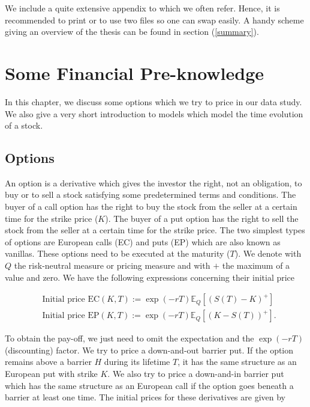 \documentclass[12pt,a4paper,oneside]{book}
\begin{document}
We include a quite extensive appendix to which we often refer. Hence, it is recommended to print or to use two files so one can swap easily. A handy scheme giving an overview of the thesis can be found in section (\ref{summary}).

\chapter{Some Financial Pre-knowledge}

In this chapter, we discuss some options which we try to price in our data study. We also give a very short introduction to models which model the time evolution of a stock. 

\section{Options}\label{Options}

An option is a derivative which gives the investor the right, not an obligation, to buy or to sell a stock satisfying some predetermined terms and conditions. The buyer of a call option has the right to buy the stock from the seller at a certain time for the strike price ($K$). The buyer of a put option has the right to sell the stock from the seller at a certain time for the strike price. The two simplest types of options are European calls (EC) and puts (EP) which are also known as vanillas. These options need to be executed at the maturity ($T$). We denote with $Q$ the risk-neutral measure or pricing measure and with $+$ the maximum of a value and zero. We have the following expressions concerning their initial price

\begin{align}\label{price_vanillas}
&\text{Initial price EC}(K,T) :=  \exp{(-rT)} \mathbb{E}_{Q} [(S(T) - K)^{+} ] \\
&\text{Initial price EP}(K,T) :=  \exp{(-rT)} \mathbb{E}_{Q}[ (K - S(T))^{+}].
\end{align}

To obtain the pay-off, we just need to omit the expectation and the $\exp{(-rT)}$ (discounting) factor. We try to price a down-and-out barrier put. If the option remains above a barrier $H$ during its lifetime $T$, it has the same structure as an European put with strike $K$. We also try to price a down-and-in barrier put which has the same structure as an European call if the option goes beneath a barrier at least one time. The initial prices for these derivatives are given by 
\end{document}
